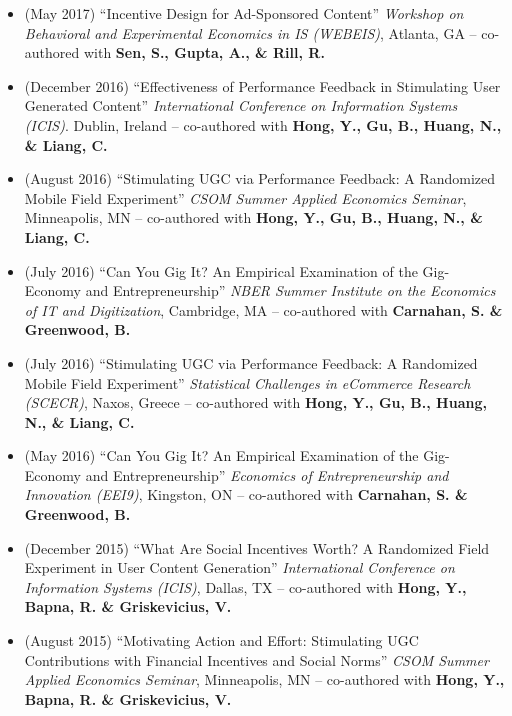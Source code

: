 \documentclass[10.5pt,letterpaper,sans]{moderncv}        %
\begin{document}
\begin{itemize}
\item (May 2017) ``Incentive Design for Ad-Sponsored Content'' \textit{Workshop on Behavioral and Experimental Economics in IS (WEBEIS)}, Atlanta, GA -- co-authored with \textbf{Sen, S., Gupta, A., \& Rill, R.}

\item (December 2016) ``Effectiveness of Performance Feedback in Stimulating User Generated Content'' \textit{International Conference on Information Systems (ICIS)}. Dublin, Ireland -- co-authored with \textbf{Hong, Y., Gu, B., Huang, N., \& Liang, C.}

\item (August 2016) ``Stimulating UGC via Performance Feedback: A Randomized Mobile Field Experiment'' \textit{CSOM Summer Applied Economics Seminar}, Minneapolis, MN -- co-authored with \textbf{Hong, Y., Gu, B., Huang, N., \& Liang, C.}

\item (July 2016) ``Can You Gig It? An Empirical Examination of the Gig-Economy and Entrepreneurship'' \textit{NBER Summer Institute on the Economics of IT and Digitization}, Cambridge, MA -- co-authored with \textbf{Carnahan, S. \& Greenwood, B.}

\item (July 2016) ``Stimulating UGC via Performance Feedback: A Randomized Mobile Field Experiment'' \textit{Statistical Challenges in eCommerce Research (SCECR)}, Naxos, Greece -- co-authored with \textbf{Hong, Y., Gu, B., Huang, N., \& Liang, C.}

\item (May 2016) ``Can You Gig It? An Empirical Examination of the Gig-Economy and Entrepreneurship'' \textit{Economics of Entrepreneurship and Innovation (EEI9)}, Kingston, ON -- co-authored with \textbf{Carnahan, S. \& Greenwood, B.}

\item (December 2015) ``What Are Social Incentives Worth? A Randomized Field Experiment in User Content Generation'' \textit{International Conference on Information Systems (ICIS)}, Dallas, TX -- co-authored with \textbf{Hong, Y., Bapna, R. \& Griskevicius, V.}

\item (August 2015) ``Motivating Action and Effort: Stimulating UGC Contributions with Financial Incentives and Social Norms'' \textit{CSOM Summer Applied Economics Seminar}, Minneapolis, MN -- co-authored with \textbf{Hong, Y., Bapna, R. \& Griskevicius, V.}


\end{itemize}
\end{document}
